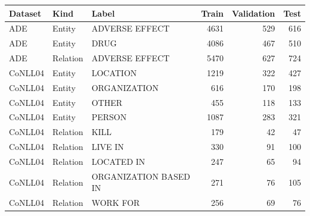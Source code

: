 \begin{tabular}{lllrrr}
\toprule
Dataset & Kind & Label & Train & Validation & Test \\
\midrule
ADE & Entity & ADVERSE EFFECT & 4631 & 529 & 616 \\
ADE & Entity & DRUG & 4086 & 467 & 510 \\
ADE & Relation & ADVERSE EFFECT & 5470 & 627 & 724 \\
CoNLL04 & Entity & LOCATION & 1219 & 322 & 427 \\
CoNLL04 & Entity & ORGANIZATION & 616 & 170 & 198 \\
CoNLL04 & Entity & OTHER & 455 & 118 & 133 \\
CoNLL04 & Entity & PERSON & 1087 & 283 & 321 \\
CoNLL04 & Relation & KILL & 179 & 42 & 47 \\
CoNLL04 & Relation & LIVE IN & 330 & 91 & 100 \\
CoNLL04 & Relation & LOCATED IN & 247 & 65 & 94 \\
CoNLL04 & Relation & ORGANIZATION BASED IN & 271 & 76 & 105 \\
CoNLL04 & Relation & WORK FOR & 256 & 69 & 76 \\
\bottomrule
\end{tabular}
